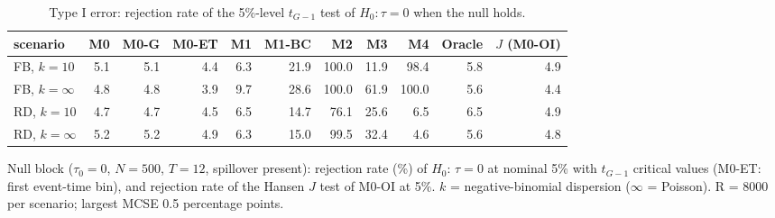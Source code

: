 \begin{table}[!t]
\centering
\caption{Type I error: rejection rate of the 5\%-level $t_{G-1}$ test of $H_0\colon \tau = 0$ when the null holds.}
\label{tab:sim-null}
\footnotesize
\setlength{\tabcolsep}{3.5pt}
\begin{adjustbox}{max width=\linewidth}
\begin{tabular}{lrrrrrrrrrr}
\toprule
scenario & M0 & M0-G & M0-ET & M1 & M1-BC & M2 & M3 & M4 & Oracle & $J$ (M0-OI) \\
\midrule
FB, $k=10$ & 5.1 & 5.1 & 4.4 & 6.3 & 21.9 & 100.0 & 11.9 & 98.4 & 5.8 & 4.9 \\
FB, $k=\infty$ & 4.8 & 4.8 & 3.9 & 9.7 & 28.6 & 100.0 & 61.9 & 100.0 & 5.6 & 4.4 \\
RD, $k=10$ & 4.7 & 4.7 & 4.5 & 6.5 & 14.7 & 76.1 & 25.6 & 6.5 & 6.5 & 4.9 \\
RD, $k=\infty$ & 5.2 & 5.2 & 4.9 & 6.3 & 15.0 & 99.5 & 32.4 & 4.6 & 5.6 & 4.8 \\
\bottomrule
\end{tabular}
\end{adjustbox}
\par\smallskip\parbox{\linewidth}{\scriptsize Null block ($\tau_0=0$, $N=500$, $T=12$, spillover present): rejection rate (\%) of $H_0{:}\,\tau=0$ at nominal 5\% with $t_{G-1}$ critical values (M0-ET: first event-time bin), and rejection rate of the Hansen $J$ test of M0-OI at 5\%. $k$ = negative-binomial dispersion ($\infty$ = Poisson). R = 8000 per scenario; largest MCSE 0.5 percentage points.}
\end{table}

